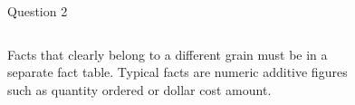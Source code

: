 \begin{frame}[fragile]{Question 2}
\begin{columns}[t,onlytextwidth]
Facts that clearly belong to a different grain must be in a separate fact
table. Typical facts are numeric additive figures such as quantity ordered or
dollar cost amount.
\vspace{-15pt}
\begin{figure}
\end{figure}
\end{columns}
\end{frame}

